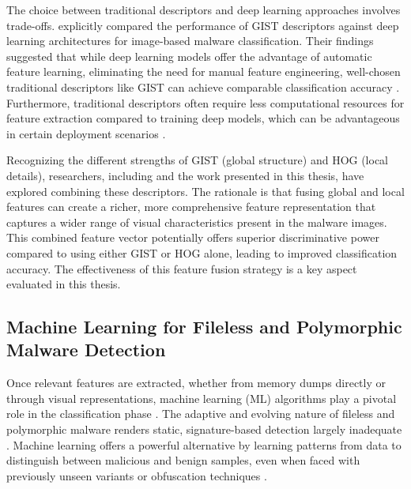 The choice between traditional descriptors and deep learning approaches involves trade-offs. \citet{yajamanam2018deep} explicitly compared the performance of GIST descriptors against deep learning architectures for image-based malware classification. Their findings suggested that while deep learning models offer the advantage of automatic feature learning, eliminating the need for manual feature engineering, well-chosen traditional descriptors like GIST can achieve comparable classification accuracy \cite{yajamanam2018deep}. Furthermore, traditional descriptors often require less computational resources for feature extraction compared to training deep models, which can be advantageous in certain deployment scenarios \cite{yajamanam2018deep}.

Recognizing the different strengths of GIST (global structure) and HOG (local details), researchers, including \citet{bozkir2021catch} and the work presented in this thesis, have explored combining these descriptors. The rationale is that fusing global and local features can create a richer, more comprehensive feature representation that captures a wider range of visual characteristics present in the malware images. This combined feature vector potentially offers superior discriminative power compared to using either GIST or HOG alone, leading to improved classification accuracy. The effectiveness of this feature fusion strategy is a key aspect evaluated in this thesis.

\subsection{Machine Learning for Fileless and Polymorphic Malware Detection}
\label{subsec:ml_detection}

Once relevant features are extracted, whether from memory dumps directly or through visual representations, machine learning (ML) algorithms play a pivotal role in the classification phase \cite{gibert2020rise}. The adaptive and evolving nature of fileless and polymorphic malware renders static, signature-based detection largely inadequate \cite{khoje2024revolutionary}. Machine learning offers a powerful alternative by learning patterns from data to distinguish between malicious and benign samples, even when faced with previously unseen variants or obfuscation techniques \cite{khalid2023insight}.

